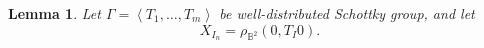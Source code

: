\documentclass[12pt,oneside]{sfsuthesis}
\theoremstyle{plain} %
\newtheorem{lemma}[theorem]{Lemma}
\theoremstyle{definition}  %
\theoremstyle{remark}  %
\theoremstyle{plain}
\begin{document}
{%



\begin{lemma}
Let $\Gamma=\left\langle T_1,\dots,T_m \right\rangle$ be well-distributed Schottky group, and let $$X_{I_n}=\rho_{\mathbb{B}^2}\left(0,T_I0 \right).$$ 


\end{lemma}}
\end{document}

